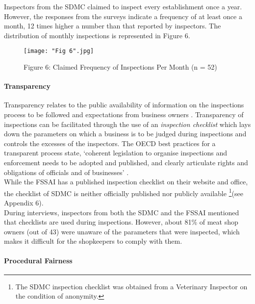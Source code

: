 \documentclass[a4paper, 12pt]{article}
\begin{document}
Inspectors from the SDMC claimed to inspect every establishment once a year. However, the responses from the surveys indicate a frequency of at least once a month, 12 times higher a number than that reported by inspectors. The distribution of monthly inspections is represented in Figure 6. \\

\begin{figure}[H]
\centering
\texttt{[image: "Fig 6".jpg]}
\caption[Optional Caption]{Figure 6: Claimed Frequency of Inspections Per Month (n = 52)}
\end{figure} 

\paragraph{Transparency}

Transparency relates to the public availability of information on the inspections process to be followed and expectations from business owners \parencite{blancreport}. Transparency of inspections can be facilitated through the use of an \textit {inspection checklist} which lays down the parameters on which a business is to be judged during inspections and controls the excesses of the inspectors. The OECD best practices for a transparent process state, ‘coherent legislation to organise inspections and enforcement needs to be adopted and published, and clearly articulate rights and obligations of officials and of businesses’ \parencite{oecd1report}.\\

While the FSSAI has a published inspection checklist on their website and office, the checklist of SDMC is neither officially published nor publicly available \footnote{ The SDMC inspection checklist was obtained from a Veterinary Inspector on the condition of anonymity.}(see Appendix 6). \\

During interviews, inspectors from both the SDMC and the FSSAI mentioned that checklists are used during inspections. However, about 81\% of meat shop owners (out of 43) were unaware of the parameters that were inspected, which makes it difficult for the shopkeepers to comply with them. \\

\paragraph{Procedural Fairness}
\end{document}
